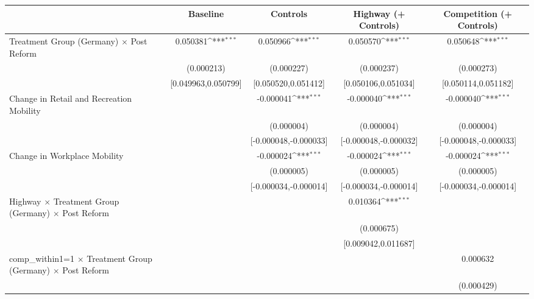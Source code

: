 {
\def\sym#1{\ifmmode^{#1}\else\(^{#1}\)\fi}
\begin{tabular}{l*{4}{c}}
\toprule
                    &\multicolumn{1}{c}{Baseline}&\multicolumn{1}{c}{Controls}&\multicolumn{1}{c}{Highway (+ Controls)}&\multicolumn{1}{c}{Competition (+ Controls)}\\
\midrule
Treatment Group (Germany) $\times$ Post Reform&    0.050381\sym{***}&    0.050966\sym{***}&    0.050570\sym{***}&    0.050648\sym{***}\\
                    &  (0.000213)         &  (0.000227)         &  (0.000237)         &  (0.000273)         \\
                    &[0.049963,0.050799]         &[0.050520,0.051412]         &[0.050106,0.051034]         &[0.050114,0.051182]         \\
Change in Retail and Recreation Mobility&                     &   -0.000041\sym{***}&   -0.000040\sym{***}&   -0.000040\sym{***}\\
                    &                     &  (0.000004)         &  (0.000004)         &  (0.000004)         \\
                    &                     &[-0.000048,-0.000033]         &[-0.000048,-0.000032]         &[-0.000048,-0.000033]         \\
Change in Workplace Mobility&                     &   -0.000024\sym{***}&   -0.000024\sym{***}&   -0.000024\sym{***}\\
                    &                     &  (0.000005)         &  (0.000005)         &  (0.000005)         \\
                    &                     &[-0.000034,-0.000014]         &[-0.000034,-0.000014]         &[-0.000034,-0.000014]         \\
Highway $\times$ Treatment Group (Germany) $\times$ Post Reform&                     &                     &    0.010364\sym{***}&                     \\
                    &                     &                     &  (0.000675)         &                     \\
                    &                     &                     &[0.009042,0.011687]         &                     \\
comp\_within1=1 $\times$ Treatment Group (Germany) $\times$ Post Reform&                     &                     &                     &    0.000632         \\
                    &                     &                     &                     &  (0.000429)         \\

\end{tabular}}
